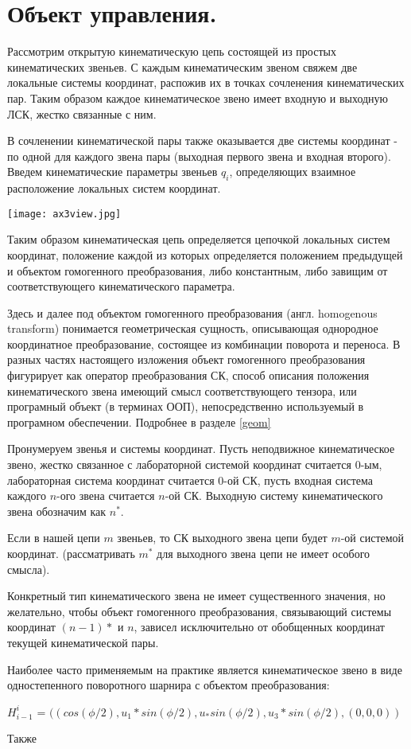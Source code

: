\section{Объект управления.}

Рассмотрим открытую кинематическую цепь состоящей из простых кинематических звеньев. С каждым кинематическим звеном свяжем две локальные системы координат, распожив их в точках сочленения кинематических пар. Таким образом каждое кинематическое звено имеет входную и выходную ЛСК, жестко связанные с ним.

В сочленении кинематической пары также оказывается две системы координат - по одной для каждого звена пары (выходная первого звена и входная второго). Введем кинематические параметры звеньев $q_i$, определяющих взаимное расположение локальных систем координат.

\begin{center}
  \texttt{[image: ax3view.jpg]}
  \label{}
\end{center}

Таким образом кинематическая цепь определяется цепочкой локальных систем координат, положение каждой из которых определяется положением предыдущей и объектом гомогенного преобразования, либо константным, либо завищим от соответствующего кинематического параметра.

\colorbox{shadecolor}
{\parbox{0.9\textwidth}{Здесь и далее под объектом гомогенного преобразования (англ. homogenous transform) понимается геометрическая сущность, описывающая однородное координатное преобразование, состоящее из комбинации поворота и переноса. В разных частях настоящего изложения объект гомогенного преобразования фигурирует как оператор преобразования СК, способ описания положения кинематического звена имеющий смысл соответствующего тензора, или програмный объект (в терминах ООП), непосредственно используемый в програмном обеспечении. Подробнее в разделе \ref{geom}}}

Пронумеруем звенья и системы координат. Пусть неподвижное кинематическое звено, жестко связанное с лабораторной системой координат считается 0-ым, лабораторная система координат считается 0-ой СК, пусть входная система каждого $n$-ого звена считается $n$-ой СК. Выходную систему кинематического звена обозначим как $n^*$. 

Если в нашей цепи $m$ звеньев, то СК выходного звена цепи будет $m$-ой системой координат. (рассматривать $m^*$ для выходного звена цепи не имеет особого смысла).

Конкретный тип кинематического звена не имеет существенного значения, но желательно, чтобы объект гомогенного преобразования, связывающий системы координат $(n-1)*$ и $n$, зависел исключительно от обобщенных координат текущей кинематической пары.

Наиболее часто применяемым на практике является кинематическое звено в виде одностепенного поворотного шарнира с объектом преобразования:

$H^i_{i-1}$ = $((cos(\phi/2), u_1*sin(\phi/2), u_*sin(\phi/2), u_3*sin(\phi/2), (0, 0, 0))$

Также 